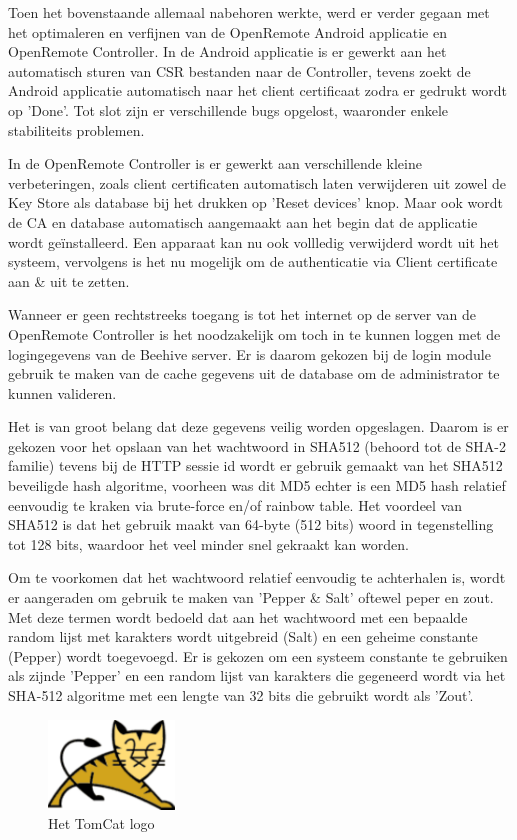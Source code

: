 \documentclass[]{article}
\begin{document}
Toen het bovenstaande allemaal nabehoren werkte, werd er verder gegaan met het
optimaleren en verfijnen van de OpenRemote Android applicatie en OpenRemote
Controller. In de Android applicatie is er gewerkt aan het automatisch sturen
van CSR bestanden naar de Controller, tevens zoekt de Android applicatie
automatisch naar het client certificaat zodra er gedrukt wordt op 'Done'. Tot
slot zijn er verschillende bugs opgelost, waaronder enkele stabiliteits
problemen.

In de OpenRemote Controller is er gewerkt aan verschillende kleine
verbeteringen, zoals client certificaten automatisch laten verwijderen uit zowel
de Key Store als database bij het drukken op 'Reset devices' knop.  Maar ook
wordt de CA en database automatisch aangemaakt aan het begin dat de applicatie
wordt geïnstalleerd.  Een apparaat kan nu ook vollledig verwijderd wordt uit het
systeem, vervolgens is het nu mogelijk om de authenticatie via Client
certificate aan \& uit te zetten. 

Wanneer er geen rechtstreeks toegang is tot het internet op de server van de
OpenRemote Controller is het noodzakelijk om toch in te kunnen loggen met de
logingegevens van de Beehive server.  Er is daarom gekozen bij de login module
gebruik te maken van de cache gegevens uit de database om de administrator te
kunnen valideren.

Het is van groot belang dat deze gegevens veilig worden opgeslagen. Daarom is er
gekozen voor het opslaan van het wachtwoord in SHA512 (behoord tot de SHA-2
familie) tevens bij de HTTP sessie id  wordt er gebruik gemaakt van het SHA512
beveiligde hash algoritme, voorheen was dit MD5 echter is een MD5 hash relatief
eenvoudig te kraken via brute-force en/of rainbow table. Het voordeel van SHA512
is dat het gebruik maakt van 64-byte (512 bits) woord in tegenstelling tot 128
bits, waardoor het veel minder snel gekraakt kan worden.

Om te voorkomen dat het wachtwoord relatief eenvoudig te achterhalen is, wordt
er aangeraden om gebruik te maken van 'Pepper \& Salt' oftewel peper en zout. Met
deze termen wordt bedoeld dat aan het wachtwoord met een bepaalde random lijst
met karakters wordt uitgebreid  (Salt) en een geheime constante (Pepper) wordt
toegevoegd. Er is gekozen om een systeem constante te gebruiken als zijnde
'Pepper' en een random lijst van karakters die gegeneerd wordt via het SHA-512
algoritme met een lengte van 32 bits die gebruikt wordt als 'Zout'. 

\begin{figure}
  \begin{center}
    \includegraphics[width=0.30\textwidth]{tomcat.pdf}
  \end{center}
  \caption{Het TomCat logo}
\end{figure}
\end{document}
